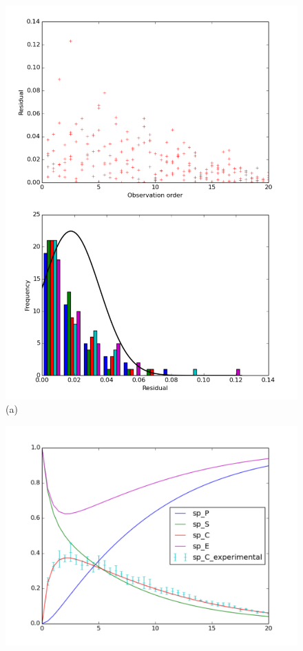 \documentclass[17pt,portrait,a1,usenames,dvipsnames,plainboxedsections]{sciposter}
\begin{document}
\begin{multicols}{2}
\begin{figure}
\begin{center}
\begin{minipage}[c]{0.56\textwidth}
\includegraphics[width=\textwidth]{analysis_of_the_residuals.pdf}\\(a)
\end{minipage}\hfill
\begin{minipage}[c]{0.41\textwidth}
\centering
\includegraphics[width=\textwidth]{fitted_model.pdf}\\

\end{minipage}
\end{center}
\end{figure}
\end{multicols}
\end{document}
